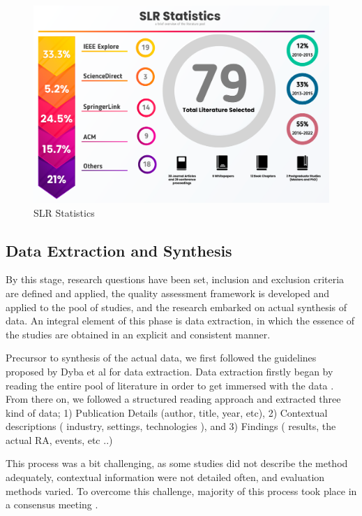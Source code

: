 \documentclass[review]{elsarticle}
\begin{document}
\begin{figure}[t]
    \includegraphics[width=13cm]{Media/databases-statitistic-[Recovered].png}
    \caption{SLR Statistics}
    \label{fig:SLRStats}
\end{figure}

\subsection{Data Extraction and Synthesis}

By this stage, research questions have been set, inclusion and exclusion criteria are defined and applied, the quality assessment framework is developed and applied to the pool of studies, and the research embarked on actual synthesis of data. An integral element of this phase is data extraction, in which the essence of the studies are obtained in an explicit and consistent manner.

Precursor to synthesis of the actual data, we first followed the guidelines proposed by Dyba et al \cite{cruzes2011recommended} for data extraction. Data extraction firstly began by reading the entire pool of literature in order to get immersed with the data \cite{braun2006using}. From there on, we followed a structured reading approach and extracted three kind of data; 1) Publication Details (author, title, year, etc), 2) Contextual descriptions ( industry, settings, technologies ), and 3) Findings ( results, the actual RA, events, etc ..)

This process was a bit challenging, as some studies did not describe the method adequately, contextual information were not detailed often, and evaluation methods varied. To overcome this challenge, majority of this process took place in a consensus meeting \cite{dyba2007applying}.
\end{document}

